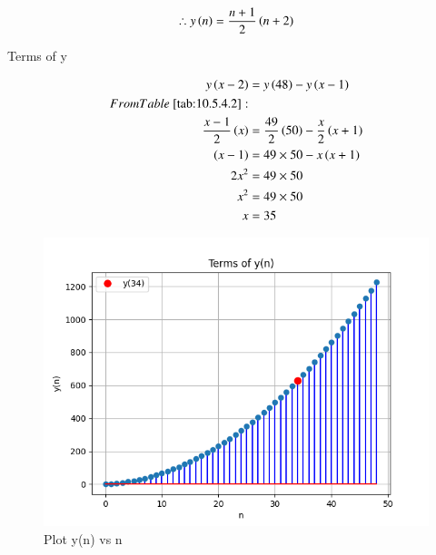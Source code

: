 \documentclass[journal,12pt,twocolumn]{IEEEtran}
\theoremstyle{remark}
\begin{document}
\begin{align}
    \therefore y\left(n\right)=\frac{n+1}{2}\left(n+2\right)
\end{align}

\begin{table}[ht]
    \centering
    \def\arraystretch{1.5}
    
   \caption{Terms of y}
   \label{tab:10.5.4.2}
\end{table}

\begin{align}
y\brak{x-2}&=y\brak{48}-y\brak{x-1}\\
From \tabref{tab:10.5.4.2}:\\
\frac{x-1}{2}\brak{x}&=\frac{49}{2}\brak{50}-\frac{x}{2}\brak{x+1}\\
\brak{x-1}&=49\times50 - x\brak{x+1}\\
2x^{2}&=49\times50\\
x^{2}&=49\times50\\
x&=35
\end{align}

\newpage
\begin{figure}[h]
    
    \includegraphics[width=\columnwidth]{figs/fig1.png}
    \caption{Plot y(n) vs n}
\end{figure}

 
\end{document}
